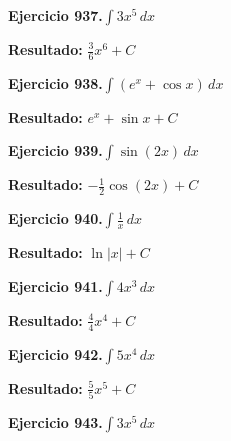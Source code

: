 \documentclass[10pt,a4paper]{article}
\begin{document}
\newpage
\begin{ejbox}
\textbf{Ejercicio 937.}\quad $\int 3x^{5}\,dx$
\end{ejbox}

\begin{solbox}
\textbf{Resultado:} \(\displaystyle \frac{3}{6}x^{6} + C\)
\end{solbox}

\begin{ejbox}
\textbf{Ejercicio 938.}\quad $\int (e^x + \cos x)\,dx$
\end{ejbox}

\begin{solbox}
\textbf{Resultado:} \(\displaystyle e^x + \sin x + C\)
\end{solbox}

\begin{ejbox}
\textbf{Ejercicio 939.}\quad $\int \sin(2x)\,dx$
\end{ejbox}

\begin{solbox}
\textbf{Resultado:} \(\displaystyle -\frac{1}{2}\cos(2x) + C\)
\end{solbox}

\newpage
\begin{ejbox}
\textbf{Ejercicio 940.}\quad $\int \frac{1}{x}\,dx$
\end{ejbox}

\begin{solbox}
\textbf{Resultado:} \(\displaystyle \ln|x| + C\)
\end{solbox}

\begin{ejbox}
\textbf{Ejercicio 941.}\quad $\int 4x^{3}\,dx$
\end{ejbox}

\begin{solbox}
\textbf{Resultado:} \(\displaystyle \frac{4}{4}x^{4} + C\)
\end{solbox}

\begin{ejbox}
\textbf{Ejercicio 942.}\quad $\int 5x^{4}\,dx$
\end{ejbox}

\begin{solbox}
\textbf{Resultado:} \(\displaystyle \frac{5}{5}x^{5} + C\)
\end{solbox}

\newpage
\begin{ejbox}
\textbf{Ejercicio 943.}\quad $\int 3x^{5}\,dx$
\end{ejbox}
\end{document}
